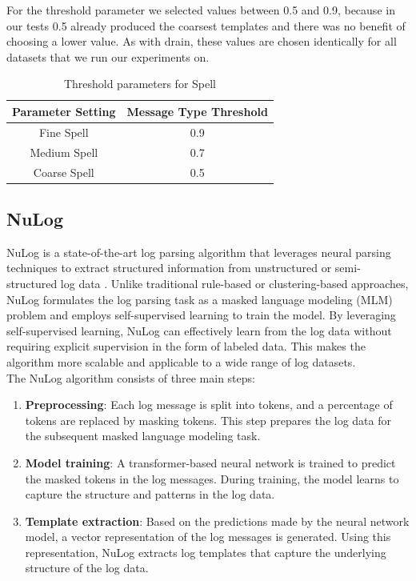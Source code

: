 For the threshold parameter we selected values between 0.5 and 0.9, because in our tests 0.5 already produced the coarsest templates and there was no benefit of choosing a lower value. As with drain, these values are chosen identically for all datasets that we run our experiments on. 

\begin{table}[h]
\centering
\begin{tabular}{|c|c|}
\hline
\textbf{Parameter Setting} & \textbf{Message Type Threshold} \\ \hline
Fine Spell   & 0.9 \\ \hline
Medium Spell & 0.7 \\ \hline
Coarse Spell & 0.5 \\ \hline
\end{tabular}
\caption{Threshold parameters for Spell}
\label{tab:spell_parameters}
\end{table}

\subsection{NuLog}
\label{sec:Methods:Algorithms:NuLog}

NuLog is a state-of-the-art log parsing algorithm that leverages neural parsing techniques to extract structured information from unstructured or semi-structured log data \cite{nedelkoski2020selfsupervised}. Unlike traditional rule-based or clustering-based approaches, NuLog formulates the log parsing task as a masked language modeling (MLM) problem and employs self-supervised learning to train the model. By leveraging self-supervised learning, NuLog can effectively learn from the log data without requiring explicit supervision in the form of labeled data. This makes the algorithm more scalable and applicable to a wide range of log datasets.\\


The NuLog algorithm consists of three main steps:
\begin{enumerate}
    \item \textbf{Preprocessing}: Each log message is split into tokens, and a percentage of tokens are replaced by masking tokens. This step prepares the log data for the subsequent masked language modeling task.
    \item \textbf{Model training}: A transformer-based neural network is trained to predict the masked tokens in the log messages. During training, the model learns to capture the structure and patterns in the log data.
    \item \textbf{Template extraction}: Based on the predictions made by the neural network model, a vector representation of the log messages is generated. Using this representation, NuLog extracts log templates that capture the underlying structure of the log data.
\end{enumerate}

